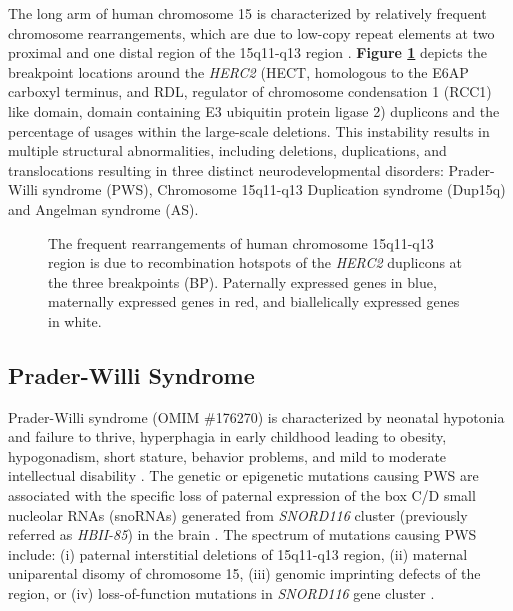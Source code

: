 The long arm of human chromosome 15 is characterized by relatively frequent chromosome rearrangements, which are due to low-copy repeat elements at two proximal and one distal region of the 15q11-q13 region \cite{Amos-Landgraf1999,Ji2000,Ji1999,Pujana2001}. \textbf{Figure \ref{Figure 1-1: }} depicts the breakpoint locations around the \textit{HERC2} (HECT, homologous to the E6AP carboxyl terminus, and RDL, regulator of chromosome condensation 1 (RCC1) like domain, domain containing E3 ubiquitin protein ligase 2) duplicons and the percentage of usages within the large-scale deletions. This instability results in multiple structural abnormalities, including deletions, duplications, and translocations \cite{Buiting1998,Christian1999,Jiang2008,Pujana2002,Webb1994} resulting in three distinct neurodevelopmental disorders: Prader-Willi syndrome (PWS), Chromosome 15q11-q13 Duplication syndrome (Dup15q) and Angelman syndrome (AS).

\begin{figure}
\centering
{}
\caption{The frequent rearrangements of human chromosome 15q11-q13 region is due to recombination hotspots of the \textit{HERC2} duplicons at the three breakpoints (BP). Paternally expressed genes in blue, maternally expressed genes in red, and biallelically expressed genes in white.}
\label{Figure 1-1: }
\end{figure}
\subsection{Prader-Willi Syndrome}

Prader-Willi syndrome (OMIM \#176270) is characterized by neonatal hypotonia and failure to thrive, hyperphagia in early childhood leading to obesity, hypogonadism, short stature, behavior problems, and mild to moderate intellectual disability \cite{Cassidy2012,Goldstone2004}. The genetic or epigenetic mutations causing PWS are associated with the specific loss of paternal expression of the box C/D small nucleolar RNAs (snoRNAs) generated from \textit{SNORD116} cluster (previously referred as \textit{HBII-85}) in the brain \cite{Bortolin-Cavaille2012,Ding2008,Duker2010}. The spectrum of mutations causing PWS include:
(i) paternal interstitial deletions of 15q11-q13 region,
(ii) maternal uniparental disomy of chromosome 15,
(iii) genomic imprinting defects of the region, or
(iv) loss-of-function mutations in \textit{SNORD116} gene cluster \cite{Cassidy2012}.


